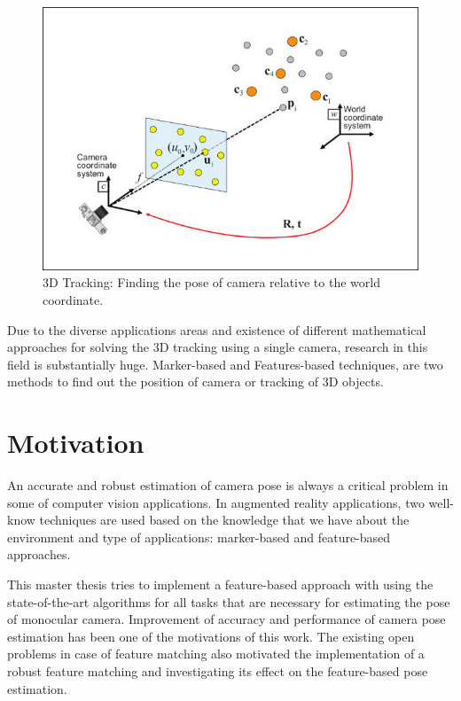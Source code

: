 \begin{figure}[H]
  \centering
  \includegraphics[width=140mm]{figures/pnp}
  \caption{3D Tracking: Finding the pose of camera relative to the world coordinate.} \label{fig:pnp_sample}
\end{figure}

Due to the diverse applications areas and existence of different mathematical approaches for solving the 3D tracking using a single camera, research in this field is substantially huge. Marker-based and Features-based techniques, are two methods to find out the position of camera or tracking of 3D objects.

\section{Motivation}
An accurate and robust estimation of camera pose is always a critical problem in some of computer vision applications. In augmented reality applications, two well-know techniques are used based on the knowledge that we have about the environment and type of applications: marker-based and feature-based approaches. 

This master thesis tries to implement a feature-based approach with using the state-of-the-art algorithms for all tasks that are necessary for estimating the pose of monocular camera. Improvement of accuracy and performance of camera pose estimation has been one of the motivations of this work. The existing open problems in case of feature matching also motivated the implementation of a robust feature matching and investigating its effect on the feature-based pose estimation. 

